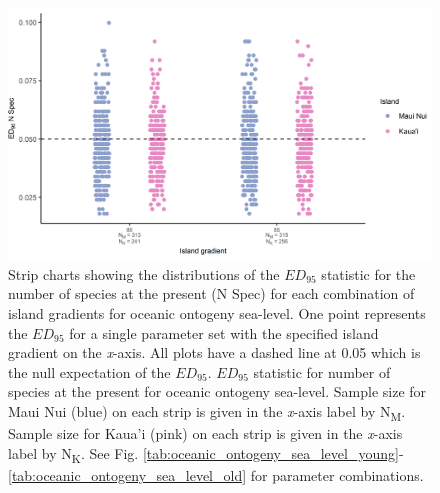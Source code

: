\begin{figure}
    \centering
    \includegraphics{Island_gradient_ontogeny_sea_level_num_spec.png}
    \caption{Strip charts showing the distributions of the $ED_{95}$ statistic for the number of species at the present (N Spec) for each combination of island gradients for oceanic ontogeny sea-level. One point represents the $ED_{95}$ for a single parameter set with the specified island gradient on the \textit{x}-axis. All plots have a dashed line at 0.05 which is the null expectation of the $ED_{95}$. $ED_{95}$ statistic for number of species at the present for oceanic ontogeny sea-level. Sample size for Maui Nui (blue) on each strip is given in the \textit{x}-axis label by N\textsubscript{M}. Sample size for Kaua'i (pink) on each strip is given in the \textit{x}-axis label by N\textsubscript{K}. See Fig. \ref{tab:oceanic_ontogeny_sea_level_young}-\ref{tab:oceanic_ontogeny_sea_level_old} for parameter combinations.}
    \label{fig:Island_gradient_ontogeny_sea_level_num_spec}
\end{figure}

